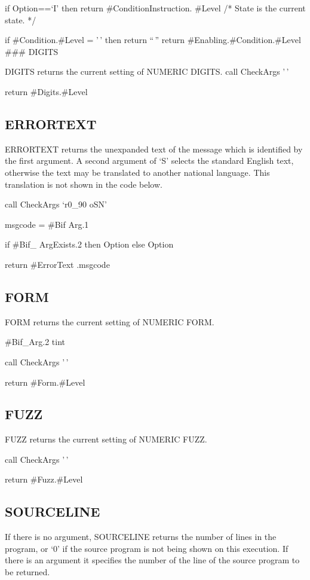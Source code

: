 if Option==`I' then return \#ConditionInstruction. \#Level /* State is
the current state. */

if \#Condition.\#Level = '\,' then return ``\,'' return
\#Enabling.\#Condition.\#Level \#\#\# DIGITS

DIGITS returns the current setting of NUMERIC DIGITS. call CheckArgs
'\,'

return \#Digits.\#Level

\hypertarget{errortext}{%
\subsection{ERRORTEXT}\label{errortext}}

ERRORTEXT returns the unexpanded text of the message which is identified
by the first argument. A second argument of `S' selects the standard
English text, otherwise the text may be translated to another national
language. This translation is not shown in the code below.

call CheckArgs `r0\_90 oSN'

msgcode = \#Bif Arg.1

if \#Bif\_ ArgExists.2 then Option else Option

return \#ErrorText .msgcode

\hypertarget{form}{%
\subsection{FORM}\label{form}}

FORM returns the current setting of NUMERIC FORM.

\#Bif\_Arg.2 tint

call CheckArgs '\,'

return \#Form.\#Level

\hypertarget{fuzz}{%
\subsection{FUZZ}\label{fuzz}}

FUZZ returns the current setting of NUMERIC FUZZ.

call CheckArgs '\,'

return \#Fuzz.\#Level

\hypertarget{sourceline}{%
\subsection{SOURCELINE}\label{sourceline}}

If there is no argument, SOURCELINE returns the number of lines in the
program, or `0' if the source program is not being shown on this
execution. If there is an argument it specifies the number of the line
of the source program to be returned.

